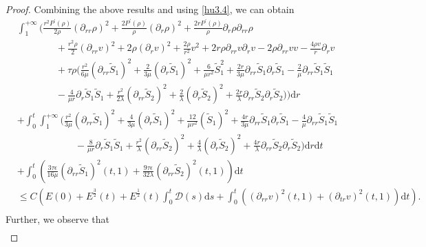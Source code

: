 \documentclass[10pt,reqno]{amsart}
\numberwithin{equation}{section}
\begin{document}
\begin{proof}
		Combining the above results and using \eqref{hu3.4}, we can obtain
		\begin{equation}\label{3.85}
			\begin{aligned}
				&\int_{1}^{+\infty}\bigg(\frac{r^2 P^{\prime}(\rho)}{2\rho} \left(\partial_{rr} \rho\right)^2+\frac{2 P^{\prime}(\rho)}{\rho}(\partial_{r}\rho)^2+\frac{2rP^{\prime}(\rho)}{\rho}\partial_{r}\rho\partial_{rr}\rho\\%
				&\qquad\qquad+\frac{r^2\rho}{2} (\partial_{rr}v)^2+2\rho(\partial_{r}v)^2+\frac{2\rho}{r^2}v^2+2r\rho\partial_{rr}v\partial_{r}v-2\rho\partial_{rr}v v-\frac{4\rho v}{r}\partial_{r}v\\%
				&\qquad\qquad+\tau\rho(\frac{r^2}{6\mu}(\partial_{rr}\tilde{S}_1)^2+\frac{2}{3\mu}(\partial_{r}\tilde{S}_1)^2+\frac{6}{\mu r^2}\tilde{S}_1^2 +\frac{2r}{3\mu}\partial_{rr}\tilde{S}_1 \partial_{r}\tilde{S}_1-\frac{2}{\mu}\partial_{rr}\tilde{S}_1\tilde{S}_1\\%
				&\qquad\qquad-\frac{4}{\mu r}\partial_{r}\tilde{S}_1 \tilde{S}_1 +\frac{r^2}{2\lambda}(\partial_{rr} \tilde{S}_2)^2+\frac{2}{\lambda}(\partial_{r} \tilde{S}_2)^2+\frac{2r}{\lambda}\partial_{rr} \tilde{S}_2\partial_{r} \tilde{S}_2)\bigg)\mathrm{d}r\\%
				&+\int_0^t\int_{1}^{+\infty}\bigg(\frac{r^2}{3\mu}(\partial_{rr}\tilde{S}_1)^2+\frac{4}{3\mu}(\partial_{r}\tilde{S}_1)^2+\frac{12}{\mu r^2}(\tilde{S}_1)^2 +\frac{4r}{3\mu}\partial_{rr}\tilde{S}_1 \partial_{r}\tilde{S}_1-\frac{4}{\mu}\partial_{rr}\tilde{S}_1\tilde{S}_1\\
				&\qquad\qquad\qquad-\frac{8}{\mu r}\partial_{r}\tilde{S}_1 \tilde{S}_1
				+\frac{r^2}{\lambda}(\partial_{rr}\tilde{S}_2)^2+\frac{4}{\lambda}(\partial_{r}  \tilde{S}_2)^2 +\frac{4r}{\lambda}\partial_{rr} \tilde{S}_2\partial_{r} \tilde{S}_2\bigg)\mathrm{d}r\mathrm{d}t\\
				&+\int_{0}^{t}\left(\frac{3\tau\epsilon}{16\mu}(\partial_{rr}\tilde{S}_1)^2(t,1)
				+\frac{9\tau\epsilon}{32\lambda}(\partial_{rr}\tilde{S}_2)^2(t,1)\right)\mathrm{d}t\\
				&\leq C \left(E(0)+E^{\frac{3}{2}}(t)+E^{\frac{1}{2}}(t) \int_{0}^{t}\mathcal{D}(s)\mathrm{d}s
				+\int_{0}^{t}((\partial_{rr}v)^2(t,1)+(\partial_{tr}v)^2(t,1))\mathrm{d}t\right).
				\\ 
			\end{aligned}
		\end{equation}
		Further, we observe that 
		\begin{equation}\nonumber
			\begin{aligned}

\end{aligned}
\end{equation}
\end{proof}
\end{document}
